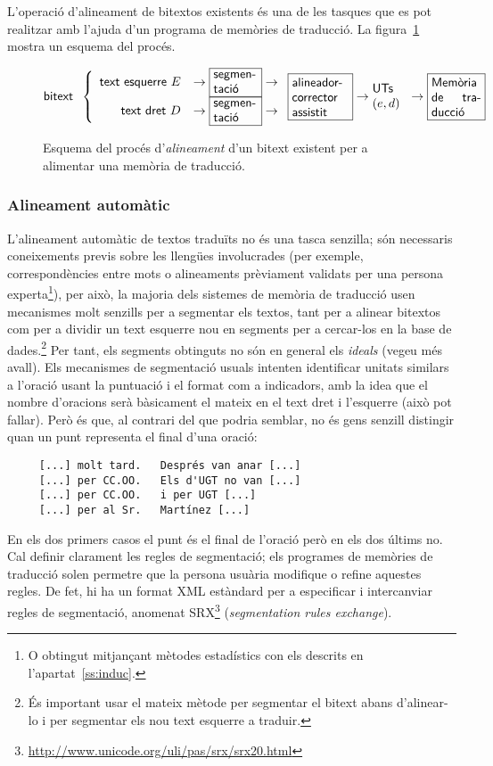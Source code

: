 L'operació d'alineament de bitextos existents és una de les tasques
que es pot realitzar amb l'ajuda d'un programa de memòries de
traducció. La figura~\ref{fg:aliMT} mostra un esquema del procés.
\begin{figure}
{\small
$$
\mbox{\textsf{bitext}}\;\;\left\{\begin{array}{rcl}
\mbox{\textsf{text esquerre $E$}} &\to \mbox{\framebox{\parbox{1.25cm}{\textsf{segmen-
      tació}}}} 
\to \\
\mbox{\textsf{text dret $D$}} &\to \mbox{\framebox{\parbox{1.25cm}{\textsf{segmen- tació}}}} 
\to \\
\end{array}
\right.
\mbox{\framebox{\parbox{1.6cm}{\textsf{alineador- corrector assistit}}}}
\to \mbox{\parbox{1cm}{\textsf{UTs} $(e,d)$}} \to \mbox{\framebox{\parbox{1.4cm}{\textsf{Memòria de traducció}}}}
$$
}
\caption{Esquema del procés d'\emph{alineament} d'un bitext existent per a alimentar
  una memòria de traducció.}
\label{fg:aliMT}
\end{figure}

\subsubsection{Alineament automàtic}

L'alineament automàtic de textos traduïts no és una tasca senzilla;
són necessaris coneixements previs sobre les llengües involucrades
(per exemple, correspondències entre mots o alineaments prèviament
validats per una persona experta\footnote{O obtingut mitjançant
  mètodes estadístics con els descrits en l'apartat~\ref{ss:induc}.}),
per això, la majoria dels sistemes de memòria de traducció usen
mecanismes molt senzills per a segmentar els textos, tant per a
alinear bitextos com per a dividir un text esquerre nou en segments
per a cercar-los en la base de dades.\footnote{És important usar el
  mateix mètode per segmentar el bitext abans d'alinear-lo i per
  segmentar els nou text esquerre a traduir.} Per tant, els segments
obtinguts no són en general els \emph{ideals} (vegeu més avall).  Els
mecanismes de segmentació usuals intenten identificar unitats similars
a l'oració usant la puntuació i el format com a indicadors, amb la
idea que el nombre d'oracions serà bàsicament el mateix en el text
dret i l'esquerre (això pot fallar). Però és que, al contrari del que
podria semblar, no és gens senzill distingir quan un punt representa
el final d'una oració:
\begin{verbatim}
     [...] molt tard.   Després van anar [...] 
     [...] per CC.OO.   Els d'UGT no van [...] 
     [...] per CC.OO.   i per UGT [...]          
     [...] per al Sr.   Martínez [...]             
\end{verbatim}
En els dos primers casos el punt és el final de l'oració però en els
dos últims no. Cal definir clarament les regles de segmentació; els
programes de memòries de traducció solen permetre que la persona
usuària modifique o refine aquestes regles. De fet, hi ha un format
XML estàndard per a especificar i intercanviar regles de segmentació,
anomenat
SRX\footnote{\url{http://www.unicode.org/uli/pas/srx/srx20.html}}
(\emph{segmentation rules exchange}).

